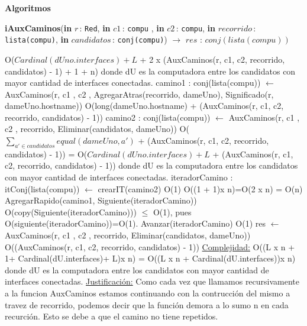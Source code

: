 \documentclass[a4paper,10pt]{article}
\let\TipoVariable=\texttt
\let\ModificadorArgumento=\textbf
\newcommand{\In}[2]{\ModificadorArgumento{in} \ensuremath{#1}\,: \TipoVariable{#2}\xspace}
\newenvironment{Algoritmos}{%
  \vspace*{2ex}%
  \noindent\textbf{\Large Algoritmos}%
  \vspace*{2ex}%
}{}
\begin{document}
\begin{Algoritmos}
\begin{algorithm}[H]{\textbf{iAuxCaminos}(\In {r}{Red}, \In {c1}{compu} , \In {c2}{compu}, \In {recorrido}{lista(compu)}, \In {candidatos}{conj(compu)}) $\to$ $res$ : $conj(lista(compu))$}
\begin{algorithmic}
			       			\Comment O($Cardinal(dUno.interfaces)+L$ + 2 x (AuxCaminos(r, c1, c2, recorrido, candidatos) - 1) + 1 + n) donde dU es la computadora entre los candidatos con mayor cantidad de interfaces conectadas.
				  \State camino1 : conj(lista(compu)) $\gets$ AuxCaminos(r, c1 , c2 , AgregarAtras(recorrido, dameUno), Significado(r, dameUno.hostname)) \Comment O(long(dameUno.hostname) + (AuxCaminos(r, c1, c2, recorrido, candidatos) - 1))
				  \State camino2 : conj(lista(compu)) $\gets$ AuxCaminos(r, c1 , c2 , recorrido, Eliminar(candidatos, dameUno)) 			\Comment O($\sum_{a' \in candidatos} equal(dameUno,a')$ + (AuxCaminos(r, c1, c2, recorrido, candidatos) - 1)) = O($Cardinal(dUno.interfaces)+L$ + (AuxCaminos(r, c1, c2, recorrido, candidatos) - 1)) donde dU es la computadora entre los candidatos con mayor cantidad de interfaces conectadas.
				  \State iteradorCamino : itConj(lista(compu)) $\gets$ crearIT(camino2) 	\Comment O(1)
				   		\Comment O((1 + 1)x n)=O(2 x n) = O(n)
				    \State AgregarRapido(camino1, Siguiente(iteradorCamino))  \Comment O(copy(Siguiente(iteradorCamino))) $\leq$ O(1), pues O(siguiente(iteradorCamino))=O(1).
				    \State Avanzar(iteradorCamino) \Comment O(1)
				  \EndWhile
			      \Else
				\State res $\gets$ AuxCaminos(r, c1 , c2 , recorrido, Eliminar(candidatos, dameUno)) 		\Comment O((AuxCaminos(r, c1, c2, recorrido, candidatos) - 1))
			      \EndIf
			  \EndIf      
			\medskip
			\Statex \underline{Complejidad:} O((L x n + 1+ Cardinal(dU.interfaces)+ L)x n) = O((L x n + Cardinal(dU.interfaces))x n) donde dU es la computadora entre los candidatos con mayor cantidad de interfaces conectadas.%
			\Statex \underline{Justificación:} Como cada vez que llamamos recursivamente a la funcion AuxCaminos estamos continuando con la contrucci\'on del mismo a travez de recorrido, podemos decir que la funci\'on demora a lo sumo n en cada recurci\'on. Esto se debe a que el camino no tiene repetidos.
    	\end{algorithmic}
\end{algorithm}


\end{Algoritmos}
\end{document}
